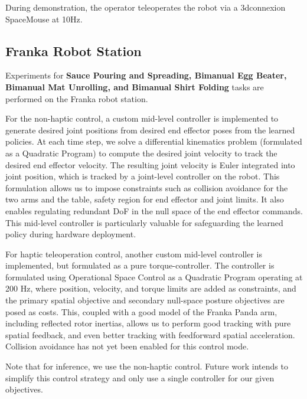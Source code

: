 During demonstration, the operator teleoperates the robot via a 3dconnexion SpaceMouse at 10Hz.

\subsection{Franka Robot Station}
\label{sec:franka_setup}
Experiments for \textbf{Sauce Pouring and Spreading, Bimanual Egg Beater, Bimanual Mat Unrolling, and
Bimanual Shirt Folding} tasks are performed on the Franka robot station. 

For the non-haptic control, a custom mid-level controller is implemented to generate desired joint positions from desired end effector poses from the learned policies. At each time step, we solve a differential kinematics problem (formulated as a Quadratic Program) to compute the desired joint velocity to track the desired end effector velocity. The resulting joint velocity is Euler integrated into joint position, which is tracked by a joint-level controller on the robot. This formulation allows us to impose constraints such as collision avoidance for the two arms and the table, safety region for end effector and joint limits. It also enables regulating redundant DoF in the null space of the end effector commands. This mid-level controller is particularly valuable for safeguarding the learned policy during hardware deployment. 

For haptic teleoperation control, another custom mid-level controller is implemented, but formulated as a pure torque-controller. The controller is formulated using Operational Space Control \citet{khatib1987osc} as a Quadratic Program operating at 200 Hz, where position, velocity, and torque limits are added as constraints, and the primary spatial objective and secondary null-space posture objectives are posed as costs.
This, coupled with a good model of the Franka Panda arm, including reflected rotor inertias, allows us to perform
good tracking with pure spatial feedback, and even better tracking with feedforward spatial acceleration.
Collision avoidance has not yet been enabled for this control mode.

Note that for inference, we use the non-haptic control. Future work intends to simplify
this control strategy and only use a single controller for our given objectives.


